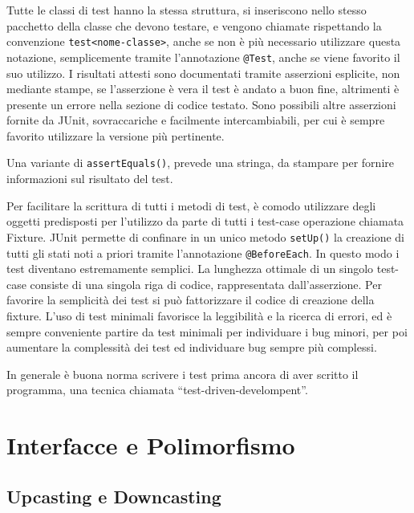 \documentclass{article}
\numberwithin{equation}{subsection}
\begin{document}
Tutte le classi di test hanno la stessa struttura, si inseriscono nello stesso pacchetto della classe che devono testare, e vengono chiamate rispettando la convenzione 
\verb|test<nome-classe>|, anche se non è più necessario utilizzare questa notazione, semplicemente tramite l'annotazione \verb|@Test|, anche se viene favorito il suo 
utilizzo. I risultati attesti sono documentati tramite asserzioni esplicite, non mediante stampe, se l'asserzione è vera il test è andato a buon fine, altrimenti è 
presente un errore nella sezione di codice testato. Sono possibili altre asserzioni fornite da JUnit, sovraccariche e facilmente intercambiabili, per cui è sempre 
favorito utilizzare la versione più pertinente. 

Una variante di \verb|assertEquals()|, prevede una stringa, da stampare per fornire informazioni sul risultato del test.  


Per facilitare la scrittura di tutti i metodi di test, è comodo utilizzare degli oggetti predisposti per l'utilizzo da parte di tutti i test-case operazione chiamata 
Fixture. JUnit permette di confinare in un unico metodo \verb|setUp()| la creazione di tutti gli stati noti a priori tramite l'annotazione \verb|@BeforeEach|. 
In questo modo i test diventano estremamente semplici. 
La lunghezza ottimale di un singolo test-case consiste di una singola riga di codice, rappresentata dall'asserzione. Per favorire la semplicità dei test si può 
fattorizzare il codice di creazione della fixture. 
L'uso di test minimali favorisce la leggibilità e la ricerca di errori, ed è sempre conveniente partire da test minimali per individuare i bug minori, per poi 
aumentare la complessità dei test ed individuare bug sempre più complessi. 

In generale è buona norma scrivere i test prima ancora di aver scritto il programma, una tecnica chiamata ``test-driven-develompent''. 

\clearpage

\section{Interfacce e Polimorfismo}

\subsection{Upcasting e Downcasting}
\end{document}
